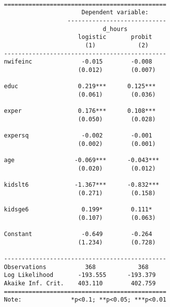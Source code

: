 \documentclass[
  letterpaper,
  DIV=11,
  numbers=noendperiod]{scrreprt}
\begin{document}
\begin{verbatim}

==============================================
                      Dependent variable:     
                  ----------------------------
                            d_hours           
                     logistic       probit    
                       (1)            (2)     
----------------------------------------------
nwifeinc              -0.015        -0.008    
                     (0.012)        (0.007)   
                                              
educ                 0.219***      0.125***   
                     (0.061)        (0.036)   
                                              
exper                0.176***      0.108***   
                     (0.050)        (0.028)   
                                              
expersq               -0.002        -0.001    
                     (0.002)        (0.001)   
                                              
age                 -0.069***      -0.043***  
                     (0.020)        (0.012)   
                                              
kidslt6             -1.367***      -0.832***  
                     (0.271)        (0.158)   
                                              
kidsge6               0.199*        0.111*    
                     (0.107)        (0.063)   
                                              
Constant              -0.649        -0.264    
                     (1.234)        (0.728)   
                                              
----------------------------------------------
Observations           368            368     
Log Likelihood       -193.555      -193.379   
Akaike Inf. Crit.    403.110        402.759   
==============================================
Note:              *p<0.1; **p<0.05; ***p<0.01
\end{verbatim}
\end{document}
